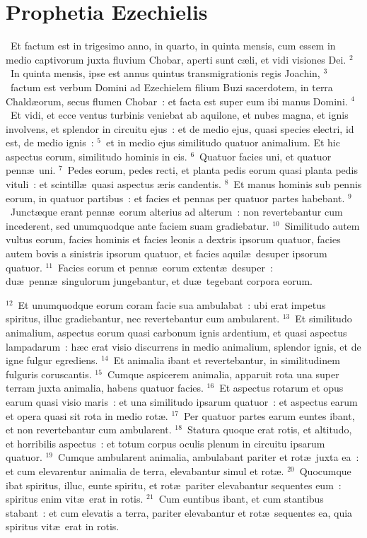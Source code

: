 {\centering \section*{Prophetia Ezechielis}}\thispagestyle{empty}

~Et factum est in trigesimo anno, in quarto, in quinta mensis, cum essem in medio captivorum juxta fluvium Chobar, aperti sunt c\ae li, et vidi visiones Dei.
${}^{2}$~In quinta mensis, ipse est annus quintus transmigrationis regis Joachin,
${}^{3}$~factum est verbum Domini ad Ezechielem filium Buzi sacerdotem, in terra Chald\ae orum, secus flumen Chobar~: et facta est super eum ibi manus Domini.
${}^{4}$~Et vidi, et ecce ventus turbinis veniebat ab aquilone, et nubes magna, et ignis involvens, et splendor in circuitu ejus~: et de medio ejus, quasi species electri, id est, de medio ignis~:
${}^{5}$~et in medio ejus similitudo quatuor animalium. Et hic aspectus eorum, similitudo hominis in eis.
${}^{6}$~Quatuor facies uni, et quatuor penn\ae\ uni.
${}^{7}$~Pedes eorum, pedes recti, et planta pedis eorum quasi planta pedis vituli~: et scintill\ae\ quasi aspectus \ae ris candentis.
${}^{8}$~Et manus hominis sub pennis eorum, in quatuor partibus~: et facies et pennas per quatuor partes habebant.
${}^{9}$~Junct\ae que erant penn\ae\ eorum alterius ad alterum~: non revertebantur cum incederent, sed unumquodque ante faciem suam gradiebatur.
${}^{10}$~Similitudo autem vultus eorum, facies hominis et facies leonis a dextris ipsorum quatuor, facies autem bovis a sinistris ipsorum quatuor, et facies aquil\ae\ desuper ipsorum quatuor.
${}^{11}$~Facies eorum et penn\ae\ eorum extent\ae\ desuper~: du\ae\ penn\ae\ singulorum jungebantur, et du\ae\ tegebant corpora eorum.


${}^{12}$~Et unumquodque eorum coram facie sua ambulabat~: ubi erat impetus spiritus, illuc gradiebantur, nec revertebantur cum ambularent.
${}^{13}$~Et similitudo animalium, aspectus eorum quasi carbonum ignis ardentium, et quasi aspectus lampadarum~: h\ae c erat visio discurrens in medio animalium, splendor ignis, et de igne fulgur egrediens.
${}^{14}$~Et animalia ibant et revertebantur, in similitudinem fulguris coruscantis.
${}^{15}$~Cumque aspicerem animalia, apparuit rota una super terram juxta animalia, habens quatuor facies.
${}^{16}$~Et aspectus rotarum et opus earum quasi visio maris~: et una similitudo ipsarum quatuor~: et aspectus earum et opera quasi sit rota in medio rot\ae .
${}^{17}$~Per quatuor partes earum euntes ibant, et non revertebantur cum ambularent.
${}^{18}$~Statura quoque erat rotis, et altitudo, et horribilis aspectus~: et totum corpus oculis plenum in circuitu ipsarum quatuor.
${}^{19}$~Cumque ambularent animalia, ambulabant pariter et rot\ae\ juxta ea~: et cum elevarentur animalia de terra, elevabantur simul et rot\ae .
${}^{20}$~Quocumque ibat spiritus, illuc, eunte spiritu, et rot\ae\ pariter elevabantur sequentes eum~: spiritus enim vit\ae\ erat in rotis.
${}^{21}$~Cum euntibus ibant, et cum stantibus stabant~: et cum elevatis a terra, pariter elevabantur et rot\ae\ sequentes ea, quia spiritus vit\ae\ erat in rotis.


